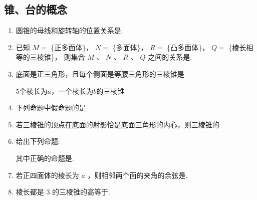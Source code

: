 \subsection*{锥、台的概念}
\begin{enumerate}
    \item 圆锥的母线和旋转轴的位置关系是.
    
    \item 已知 $M =$ \{正多面体\}， $N =$ \{多面体\}， $R =$ \{凸多面体\}， $Q =$ \{棱长相等的三棱锥\}， 则集合 $M\text{ 、 }N\text{ 、 }R\text{ 、 }Q$ 之间的关系是.

    \item 底面是正三角形，且每个侧面是等腰三角形的三棱锥是   
    \begin{jieda}
        5个棱长为$a$，一个棱长为$b$的三棱锥
    \end{jieda}
    
    \item 下列命题中假命题的是   
    
    \item 若三棱锥的顶点在底面的射影恰是底面三角形的内心，则三棱锥的
    
    
    \item 给出下列命题:
    其中正确的命题是.

    \item 若正四面体的棱长为 $a$ ，则相邻两个面的夹角的余弦是.
    
    \item 棱长都是 3 的三棱锥的高等于.


\end{enumerate}
